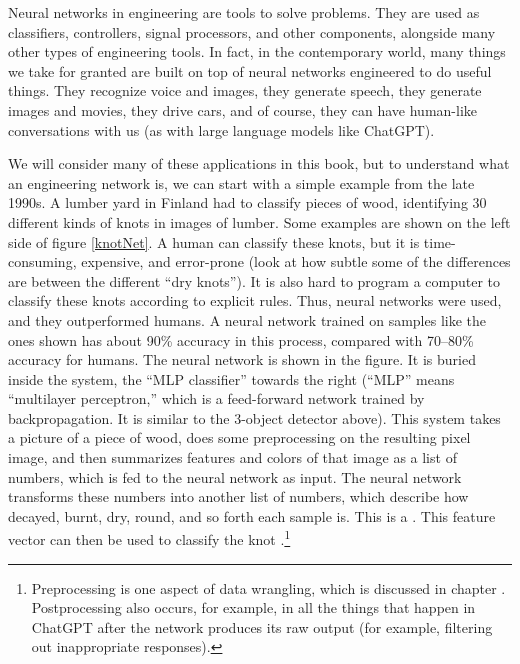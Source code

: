 Neural networks in engineering are tools to solve problems. They are used as classifiers, controllers, signal processors, and other components, alongside many other types of engineering tools. In fact, in the contemporary world, many things we take for granted are built on top of neural networks engineered to do useful things. They recognize voice and images, they generate speech, they generate images and movies, they drive cars, and of course, they can have human-like conversations with us (as with large language models like ChatGPT).

We will consider many of these applications in this book, but to understand what an engineering network is, we can start with a simple example from the late 1990s. A lumber yard in Finland had to classify pieces of wood, identifying 30 different kinds of knots in images of lumber. Some examples are shown on the left side of figure \ref{knotNet}. A human can classify these knots, but it is time-consuming, expensive, and error-prone (look at how subtle some of the differences are between the different ``dry knots''). It is also hard to program a computer to classify these knots according to explicit rules. Thus, neural networks were used, and they outperformed humans. A neural network trained on samples like the ones shown has about 90\% accuracy in this process, compared with 70--80\% accuracy for humans. The neural network is shown in the figure. It is buried inside the system, the ``MLP classifier'' towards the right (``MLP'' means ``multilayer perceptron,'' which is a feed-forward network trained by backpropagation. It is similar to the 3-object detector above). This system takes a picture of a piece of wood, does some preprocessing on the resulting pixel image, and then summarizes features and colors of that image as a list of numbers, which is fed to the neural network as input. The neural network transforms these numbers into another list of numbers, which describe how decayed, burnt, dry, round, and so forth each sample is. This is a . This feature vector can then be used to classify the knot \cite{heikkonen1999building}.\footnote{Preprocessing is one aspect of data wrangling, which is discussed in chapter . Postprocessing also occurs, for example, in all the things that happen in ChatGPT after the network produces its raw output (for example, filtering out inappropriate responses).}


